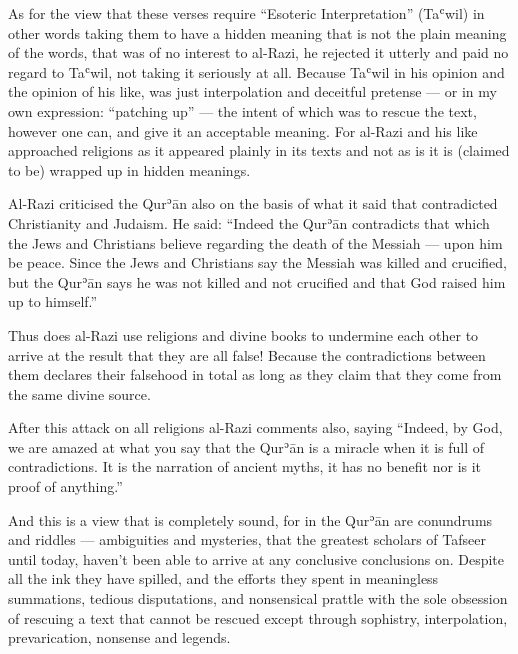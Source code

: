 \documentclass[12pt]{memoir}
\def\´{ʾ} %
\def\`{ʿ} %
\def \Quran{Qur\-\´ān} %
\let \Qrn=\Quran      %
\begin{document}
As for the view that these verses require “Esoteric Interpretation” (Ta\`wil)
in other words taking them to have a hidden meaning that is not the plain
meaning of the words, that was of no interest to al-Razi, he rejected it
utterly and paid no regard to Ta\`wil, not taking it seriously at all.
Because Ta\`wil in his opinion and the opinion of his like, was just
interpolation and deceitful pretense — or in my own expression:
“patching up” — the intent of which was to rescue the text, however one can,
and give it an acceptable meaning.
For al-Razi and his like approached religions as it appeared plainly
in its texts and not as is it is (claimed to be)
wrapped up in hidden meanings.\footnotemark


Al-Razi criticised the \Qrn{} also on the basis of what it said that
contradicted Christianity and Judaism.
He said: “Indeed the \Qrn{} contradicts that which the Jews and Christians
believe regarding the death of the Messiah — upon him be peace.
Since the Jews and Christians say the Messiah was killed and crucified,
but the \Qrn{} says he was not killed and not crucified and that God
raised him up to himself.”\footnotemark


Thus does al-Razi use religions and divine books to undermine each other
to arrive at the result that they are all false!
Because the contradictions between them declares their falsehood in total
as long as they claim that they come from the same divine source.

After this attack on all religions al-Razi comments also, saying
“Indeed, by God, we are amazed at what you say that the \Qrn{} is a miracle
when it is full of contradictions.
It is the narration of ancient myths,
it has no benefit nor is it proof of anything.”\footnotemark


And this is a view that is completely sound,
for in the \Qrn{} are conundrums and riddles — ambiguities and mysteries,
that the greatest scholars of Tafseer until today,
haven’t been able to arrive at any conclusive conclusions on.
Despite all the ink they have spilled,
and the efforts they spent in meaningless summations, tedious disputations,
and nonsensical prattle with the sole obsession of rescuing a text
that cannot be rescued except through sophistry, interpolation,
prevarication, nonsense and legends.\footnotemark
\end{document}
